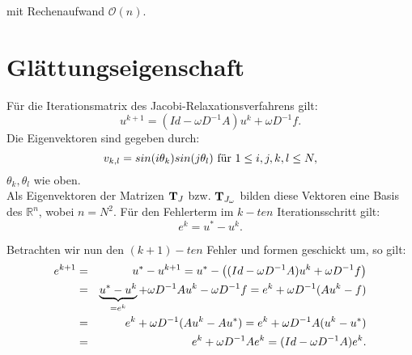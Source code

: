 mit Rechenaufwand $\mathcal{O}(n)$.

\section{Glättungseigenschaft}\label{s.Glättungseigenschaft}

Für die Iterationsmatrix des Jacobi-Relaxationsverfahrens gilt:
\begin{equation}
u^{k+1} = (Id - \omega D^{-1}A)u^{k} + \omega D^{-1}f.
\end{equation}
Die Eigenvektoren sind gegeben durch:
\begin{equation}
v_{k,l} = sin(i \theta_{k})sin(j \theta_{l}) \textnormal{ für } 1 \le i,j,k,l \le N,
\end{equation}
$\theta_{k}, \theta_{l}$ wie oben.\\
Als Eigenvektoren der Matrizen ${\textbf{T}}_{J}$ bzw. ${\textbf{T}}_{J_{\omega}}$ bilden diese Vektoren eine Basis des $\mathbb{R}^{n}$, wobei $n = N^{2}$.
Für den Fehlerterm im $k-ten$ Iterationsschritt gilt:
\begin{equation}
e^{k} = u^{*} - u^{k}.
\end{equation}

Betrachten wir nun den $(k+1)-ten$ Fehler und formen geschickt um, so gilt:
\begin{eqnarray}
e^{k+1} &=& u^{*} - u^{k+1} = u^{*} - \left( (Id - \omega D^{-1} A)u^{k} + \omega D^{-1}f \right) \notag \\
&=& \underbrace{u^{*} - u^{k}}_{= e^{k}} + \omega D^{-1} A u^{k} - \omega D^{-1}f = e^{k} + \omega D^{-1} (Au^{k} - f) \notag \\
&=& e^{k} + \omega D^{-1} (Au^{k} - Au^{*}) = e^{k} + \omega D^{-1} A(u^{k} - u^{*}) \notag \\
&=& e^{k} + \omega D^{-1} A e^{k} = (Id - \omega D^{-1} A) e^{k}.
\end{eqnarray}

\label{img.Jacobi1}

